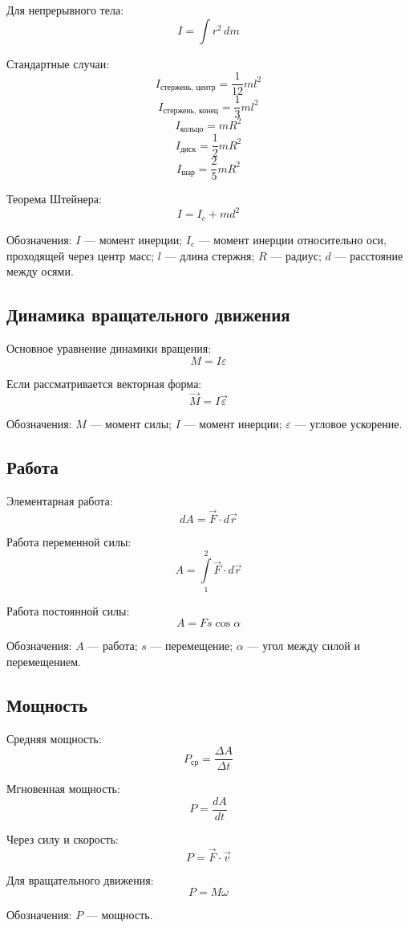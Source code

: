 \documentclass[a4paper,12pt]{article}
\begin{document}
Для непрерывного тела:
\[
I = \int r^2\, dm
\]

Стандартные случаи:
\[
I_{\text{стержень, центр}} = \frac{1}{12} m l^2
\]
\[
I_{\text{стержень, конец}} = \frac{1}{3} m l^2
\]
\[
I_{\text{кольцо}} = m R^2
\]
\[
I_{\text{диск}} = \frac{1}{2} m R^2
\]
\[
I_{\text{шар}} = \frac{2}{5} m R^2
\]

Теорема Штейнера:
\[
I = I_c + m d^2
\]

Обозначения:  
\(I\) — момент инерции;  
\(I_c\) — момент инерции относительно оси, проходящей через центр масс;  
\(l\) — длина стержня;  
\(R\) — радиус;  
\(d\) — расстояние между осями.

\subsection{Динамика вращательного движения}

Основное уравнение динамики вращения:
\[
M = I \varepsilon
\]

Если рассматривается векторная форма:
\[
\vec M = I \vec \varepsilon
\]

Обозначения:  
\(M\) — момент силы;  
\(I\) — момент инерции;  
\(\varepsilon\) — угловое ускорение.

\subsection{Работа}

Элементарная работа:
\[
dA = \vec F \cdot d\vec r
\]

Работа переменной силы:
\[
A = \int\limits_{1}^{2} \vec F \cdot d\vec r
\]

Работа постоянной силы:
\[
A = F s \cos \alpha
\]

Обозначения:  
\(A\) — работа;  
\(s\) — перемещение;  
\(\alpha\) — угол между силой и перемещением.

\subsection{Мощность}

Средняя мощность:
\[
P_{\text{ср}} = \frac{\Delta A}{\Delta t}
\]

Мгновенная мощность:
\[
P = \frac{dA}{dt}
\]

Через силу и скорость:
\[
P = \vec F \cdot \vec v
\]

Для вращательного движения:
\[
P = M \omega
\]

Обозначения:  
\(P\) — мощность.
\end{document}
